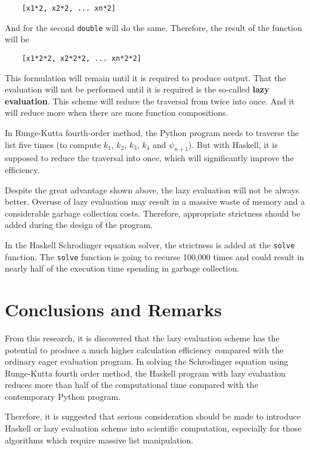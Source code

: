 \documentclass[11pt]{article}
\begin{document}
\begin{lstlisting}
	[x1*2, x2*2, ... xn*2]
\end{lstlisting}

And for the second \lstinline{double} will do the same. Therefore, the result of the function will be

\begin{lstlisting}
	[x1*2*2, x2*2*2, ... xn*2*2]
\end{lstlisting}

This formulation will remain until it is required to produce output. That the evaluation will not be performed until it is required is the so-called \textbf{lazy evaluation}. This scheme will reduce the traversal from twice into once. And it will reduce more when there are more function compositions.

In Runge-Kutta fourth-order method, the Python program needs to traverse the list five times (to compute $k_1$, $k_2$, $k_3$, $k_4$ and $\psi_{n+1}$). But with Haskell, it is supposed to reduce the traversal into once, which will significantly improve the efficiency.

Despite the great advantage shown above, the lazy evaluation will not be always better. Overuse of lazy evaluation may result in a massive waste of memory and a considerable garbage collection costs. Therefore, appropriate strictness should be added during the design of the program.

In the Haskell Schrodinger equation solver, the strictness is added at the \lstinline{solve} function. The \lstinline{solve} function is going to recurse 100,000 times and could result in nearly half of the execution time spending in garbage collection.

\section{Conclusions and Remarks}

From this research, it is discovered that the lazy evaluation scheme has the potential to produce a much higher calculation efficiency compared with the ordinary eager evaluation program. In solving the Schrodinger equation using Runge-Kutta fourth order method, the Haskell program with lazy evaluation reduces more than half of the computational time compared with the contemporary Python program. 

Therefore, it is suggested that serious consideration should be made to introduce Haskell or lazy evaluation scheme into scientific computation, especially for those algorithms which require massive list manipulation.
\end{document}
